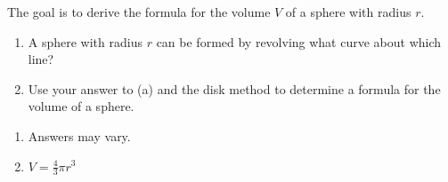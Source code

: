 {\label{ex:07_02_ex_23}The goal is to derive the formula for the volume $V$ of a sphere with radius $r$.
\begin{enumerate}
\item A sphere with radius $r$ can be formed by revolving what curve about which line?
\item Use your answer to (a) and the disk method to determine a formula for the volume of a sphere.
\end{enumerate}
}
{\begin{enumerate}
\item Answers may vary.
\item $V=\frac{4}{3}\pi r^3$
\end{enumerate}
}
